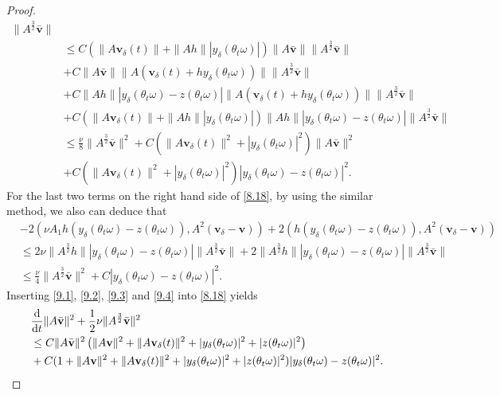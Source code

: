 \documentclass{elsarticle}
\theoremstyle{definition}
\numberwithin{equation}{section}
\renewcommand{\d}{{\rm{d}}}
\begin{document}
\begin{proof}
\begin{align}
\|A^\frac32\bar{\textbf{v}}\|\nonumber\\
&\leq C(\|A\textbf{v}_\delta(t)\|+\|Ah\||y_\delta(\theta_t\omega)|)\|A\bar{\textbf{v}}\|
\|A^\frac32\bar{\textbf{v}}\|\nonumber\\
&+C\|A\bar{\textbf{v}}\|\|A(\textbf{v}_\delta(t)+hy_\delta(\theta_t\omega))\|
\|A^\frac32\bar{\textbf{v}}\|\nonumber\\
&+C\|Ah\||y_\delta(\theta_t\omega)-z(\theta_t\omega)|\|A(\textbf{v}_\delta(t)+hy_\delta(\theta_t\omega))\|
\|A^\frac32\bar{\textbf{v}}\|\nonumber\\
&+C(\|A\textbf{v}_\delta(t)\|+\|Ah\||y_\delta(\theta_t\omega)|)\|Ah\||y_\delta(\theta_t\omega)-z(\theta_t\omega)|
\|A^\frac32\bar{\textbf{v}}\|\nonumber\\
&\leq \frac{\nu}{8}\|A^\frac32\bar{\textbf{v}}\|^2
+C(\|A\textbf{v}_\delta(t)\|^2+|y_\delta(\theta_t\omega)|^2)\|A\bar{\textbf{v}}\|^2\nonumber\\
&+C(\|A\textbf{v}_\delta(t)\|^2+|y_\delta(\theta_t\omega)|^2)|y_\delta(\theta_t\omega)-z(\theta_t\omega)|^2.
\end{align}
For the last two terms on the right hand side of \eqref{8.18}, by using the similar method, we also can deduce that
\begin{align}\label{9.4}
&-  2(\nu A_1h(y_\delta(\theta_t\omega)-z(\theta_t\omega)),A^2(\textbf{v}_\delta-\textbf{v}))
+2(h(y_\delta (\theta_t\omega)-z(\theta_t\omega)),A^2(\textbf{v}_\delta-\textbf{v}))\nonumber\\
&\leq 2\nu\|A^\frac32h\||y_\delta(\theta_t\omega)-z(\theta_t\omega)|\|A^\frac32\bar{\textbf{v}}\|
+2\|A^\frac32h\||y_\delta(\theta_t\omega)-z(\theta_t\omega)|\|A^\frac32\bar{\textbf{v}}\|
\nonumber\\
&\leq \frac{\nu}{4}\|A^\frac32\bar{\textbf{v}}\|^2+C|y_\delta(\theta_t\omega)-z(\theta_t\omega)|^2.
\end{align}
Inserting \eqref{9.1}, \eqref{9.2}, \eqref{9.3} and \eqref{9.4} into \eqref{8.18} yields
\begin{align}\label{9.15}
&\frac{\d}{\d t}\|A\bar{\textbf{v}}\|^2+\frac12\nu\|A^{\frac32} \bar{\textbf{v}}\|^2\nonumber\\
&\leq C\|A\bar{\textbf{v}}\|^2 \left ( \|A\textbf{v}\|^2+\|A\textbf{v}_\delta(t)\|^2+|y_\delta(\theta_t\omega)|^2+|z(\theta_t\omega)|^2 \right ) \nonumber\\
 &+C(1+\|A\textbf{v}\|^2+\|A\textbf{v}_\delta(t)\|^2+|y_\delta(\theta_t\omega)|^2+|z(\theta_t\omega)|^2
 )|y_\delta(\theta_t\omega)-z(\theta_t\omega)|^2.
\end{align}

\end{proof}
\end{document}
